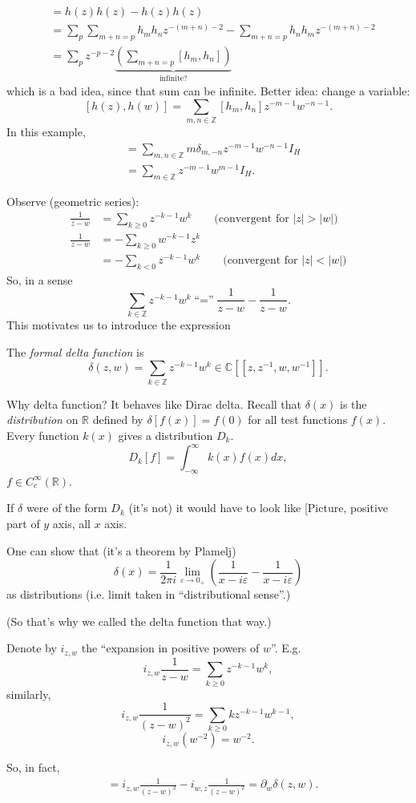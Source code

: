 \begin{align*}
[h(z),h(z)]&=h(z)h(z)-h(z)h(z)\\
&=\sum_{p}\sum_{m+n=p}h_mh_nz^{-(m+n)-2}
-\sum_{m+n=p}h_nh_mz^{-(m+n)-2}\\
&=\sum_p z^{-p-2}\underbrace{\left(\sum_{m+n=p}[h_m,h_n]\right)}
_{\text{infinite?}}
\end{align*}
which is a bad idea, since that sum can be infinite.
Better idea: change a variable:
$$
[h(z),h(w)]=\sum_{m,n \in \mathbb{Z}}[h_m,h_n]z^{-m-1}w^{-n-1}.
$$
In this example,
\begin{align*}
[h(z),h(w)]&=\sum_{m,n \in \mathbb{Z}}m \delta_{m,-n}z^{-m-1}
w^{-n-1}I_H\\
&=\sum_{m \in \mathbb{Z}}z^{-m-1}w^{m-1}I_H.
\end{align*}

Observe (geometric series):
\begin{align*}
\frac{1}{z-w}&=\sum_{k \geq 0}z^{-k-1}w^k\qquad 
\text{(convergent for $|z|>|w|$)}\\
\frac{1}{z-w}&=-\sum_{k \geq 0}w^{-k-1}z^k\\
&=-\sum_{k<0}z^{-k-1}w^k\qquad \text{(convergent for $|z|<|w|$)}
\end{align*}
So, in a sense
$$
\sum_{k \in \mathbb{Z}}z^{-k-1}w^k\text{``$=$''}\frac{1}{z-w}
-\frac{1}{z-w}.
$$
This motivates us to introduce the expression
\begin{definition}
\label{definition-delta-function}
The {\it formal delta function} is
$$
\delta(z,w)=\sum_{k \in \mathbb{Z}}z^{-k-1}w^k \in 
\mathbb{C}[\![z,z^{-1},w,w^{-1}]\!].
$$
\end{definition}
Why delta function? It behaves like Dirac delta.
Recall that $\delta(x)$ is the 
{\it distribution} on $\mathbb{R}$ defined by
$\delta[f(x)]=f(0)$ for all test functions $f(x)$.
Every function $k(x)$ gives a distribution $D_k$.
$$
D_k[f]=\int_{-\infty}^\infty k(x)f(x)dx,
$$
$f \in C_c^\infty(\mathbb{R})$.

If $\delta$ were of the form $D_k$ (it's not)
it would have to look like 
[Picture, positive part of $y$ axis, all $x$ axis.

One can show that (it's a theorem by Plamelj)
$$
\delta(x)=\frac{1}{2\pi i}\lim_{\varepsilon \to 0_+} 
\left(\frac{1}{x-i \varepsilon}-\frac{1}{x-i \varepsilon}\right)
$$
as distributions (i.e. limit taken in ``distributional sense''.)

(So that's why we called the delta function that way.)

Denote by $i_{z,w}$ the ``expansion in positive powers of $w$''.
E.g. 
$$
i_{z,w}\frac{1}{z-w}=\sum_{k\geq 0}z^{-k-1}w^k,
$$
similarly,
$$
i_{z,w}\frac{1}{(z-w)^2}=\sum_{k \geq 0}kz^{-k-1}w^{k-1},
$$
$$
i_{z,w}(w^{-2})=w^{-2}.
$$
\begin{exercise}
\label{exercise-derivative-wrt-w}
So, in fact,
\begin{align*}
[h(z),h(w)]&=i_{z,w}\frac{1}{(z-w)^2}-i_{w,z}\frac{1}{(z-w)^2}
=\partial_w \delta(z,w).
\end{align*}
\end{exercise}

